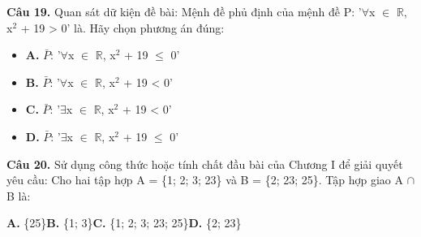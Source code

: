 \documentclass[11pt,a4paper]{article}
\begin{document}
\textbf{\color{primary} Câu 19.} Quan sát dữ kiện đề bài: Mệnh đề phủ định của mệnh đề P: '$\forall$x $\in$ $\mathbb{R}$, x$^2$ + 19 > 0' là. Hãy chọn phương án đúng:\par
\begin{itemize}\setlength{\itemsep}{1pt}\setlength{\parskip}{0pt}
  \item[] \textbf{A.} $\bar{P}$: '$\forall$x $\in$ $\mathbb{R}$, x$^2$ + 19 $\le$ 0'
  \item[] \textbf{B.} $\bar{P}$: '$\forall$x $\in$ $\mathbb{R}$, x$^2$ + 19 < 0'
  \item[] \textbf{C.} $\bar{P}$: '$\exists$x $\in$ $\mathbb{R}$, x$^2$ + 19 < 0'
  \item[] \textbf{D.} $\bar{P}$: '$\exists$x $\in$ $\mathbb{R}$, x$^2$ + 19 $\le$ 0'
\end{itemize}\vspace{2pt}
\textbf{\color{primary} Câu 20.} Sử dụng công thức hoặc tính chất đầu bài của Chương I để giải quyết yêu cầu: Cho hai tập hợp A = \{1; 2; 3; 23\} và B = \{2; 23; 25\}. Tập hợp giao A $\cap$ B là:\par
\hspace*{1.5em}\textbf{A.} \{25\}\quad\quad \textbf{B.} \{1; 3\}\quad\quad \textbf{C.} \{1; 2; 3; 23; 25\}\quad\quad \textbf{D.} \{2; 23\}\par\vspace{2pt}
\end{document}
